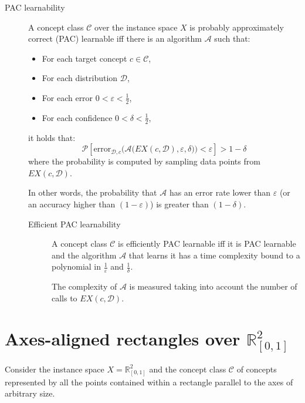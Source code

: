 \begin{description}
    \item[PAC learnability] 
        A concept class $\mathcal{C}$ over the instance space $X$ is probably approximately correct (PAC) learnable iff there is an algorithm $\mathcal{A}$ such that:
        \begin{itemize}
            \item For each target concept $c \in \mathcal{C}$,
            \item For each distribution $\mathcal{D}$, 
            \item For each error $0 < \varepsilon < \frac{1}{2}$,
            \item For each confidence $0 < \delta < \frac{1}{2}$,
        \end{itemize}
        it holds that:
        \[ \mathcal{P}\left[ \text{error}_{\mathcal{D}, c}\Big( \mathcal{A}\big( EX(c, \mathcal{D}), \varepsilon, \delta \big) \Big) < \varepsilon \right] > 1-\delta \]
        where the probability is computed by sampling data points from $EX(c, \mathcal{D})$.

        In other words, the probability that $\mathcal{A}$ has an error rate lower than $\varepsilon$ (or an accuracy higher than $(1-\varepsilon)$) is greater than $(1-\delta)$.

        \begin{description}
            \item[Efficient PAC learnability] 
                A concept class $\mathcal{C}$ is efficiently PAC learnable iff
                it is PAC learnable and the algorithm $\mathcal{A}$ that learns it has 
                a time complexity bound to a polynomial in $\frac{1}{\varepsilon}$ and $\frac{1}{\delta}$.

                \begin{remark}
                    The complexity of $\mathcal{A}$ is measured taking into account the number of calls to $EX(c, \mathcal{D})$.
                \end{remark}
        \end{description}
\end{description}



\section{Axes-aligned rectangles over $\mathbb{R}^2_{[0, 1]}$}

Consider the instance space $X = \mathbb{R}^2_{[0, 1]}$
and the concept class $\mathcal{C}$ of concepts represented by all the points contained within a rectangle parallel to the axes of arbitrary size.

